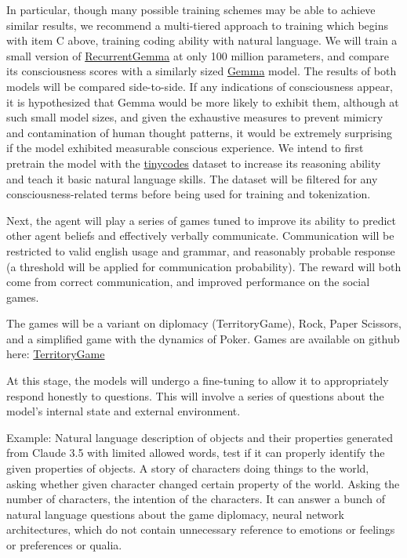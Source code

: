 \documentclass{article}
\begin{document}
In particular, though many possible training schemes may be able to achieve similar results, we recommend a multi-tiered approach to training which begins with item C above, training coding ability with natural language.
We will train a small version of \href{https://github.com/google-deepmind/recurrentgemma}{RecurrentGemma} at only 100 million parameters, and compare its consciousness scores with a similarly sized \href{https://github.com/google/gemma_pytorch}{Gemma} model. The results of both models will be compared side-to-side. If any indications of consciousness appear, it is hypothesized that Gemma would be more likely to exhibit them, although at such small model sizes, and given the exhaustive measures to prevent mimicry and contamination of human thought patterns, it would be extremely surprising if the model exhibited measurable conscious experience.
We intend to first pretrain the model with the \href{https://huggingface.co/datasets/nampdn-ai/tiny-codes}{tinycodes} dataset to increase its reasoning ability and teach it basic natural language skills. The dataset will be filtered for any consciousness-related terms before being used for training and tokenization.

Next, the agent will play a series of games tuned to improve its ability to predict other agent beliefs and effectively verbally communicate. Communication will be restricted to valid english usage and grammar, and reasonably probable response (a threshold will be applied for communication probability). The reward will both come from correct communication, and improved performance on the social games.

The games will be a variant on diplomacy (TerritoryGame), Rock, Paper Scissors, and a simplified game with the dynamics of Poker. Games are available on github here: \href{https://github.com/morganrivers/consciousness_games}{TerritoryGame}

At this stage, the models will undergo a fine-tuning to allow it to appropriately respond honestly to questions. This will involve a series of questions about the model's internal state and external environment.

Example: Natural language description of objects and their properties generated from Claude 3.5 with limited allowed words, test if it can properly identify the given properties of objects. A story of characters doing things to the world, asking whether given character changed certain property of the world. Asking the number of characters, the intention of the characters. It can answer a bunch of natural language questions about the game diplomacy, neural network architectures, which do not contain unnecessary reference to emotions or feelings or preferences or qualia.
\end{document}
